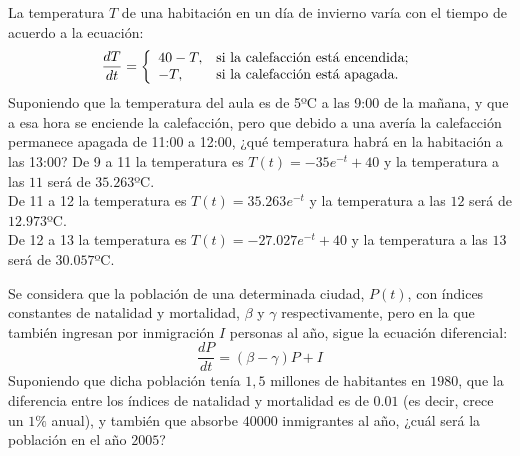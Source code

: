 {La temperatura $T$ de una habitación en un día de invierno varía con el tiempo de acuerdo a la ecuación:
\[
\frac{dT}{dt}=
\left\{
  \begin{array}{ll}
    40-T, & \hbox{si la calefacción está encendida;} \\
    -T, & \hbox{si la calefacción está apagada.}
  \end{array}
\right.
\]
Suponiendo que la temperatura del aula es de 5ºC  a las 9:00 de la mañana, y que a esa hora se enciende la
calefacción, pero que debido a una avería la calefacción permanece apagada de 11:00 a 12:00, ¿qué temperatura habrá en
la habitación a las 13:00?}
{De 9 a 11 la temperatura es $T(t)=-35e^{-t}+40$ y la temperatura a las $11$ será de $35.263$ºC.\\
De 11 a 12 la temperatura es $T(t)=35.263e^{-t}$ y la temperatura a las $12$ será de $12.973$ºC.\\
De 12 a 13 la temperatura es $T(t)=-27.027e^{-t}+40$ y la temperatura a las $13$ será de $30.057$ºC.
}
{}


{Se considera que la población de una determinada ciudad, $P(t)$, con índices constantes de natalidad y mortalidad,
$\beta$ y $\gamma$ respectivamente, pero en la que también ingresan por inmigración $I$ personas al año, sigue la
ecuación diferencial:
\[
\frac{{dP}} {{dt}} = \left( {\beta  - \gamma } \right)P + I
\]
Suponiendo que dicha población tenía $1,5$ millones de habitantes en $1980$, que la diferencia entre los índices de
natalidad y mortalidad es de $0.01$ (es decir, crece un $1\%$ anual), y también que absorbe $40000$ inmigrantes al año,
¿cuál será la población en el año $2005$?}
{
}
{}


